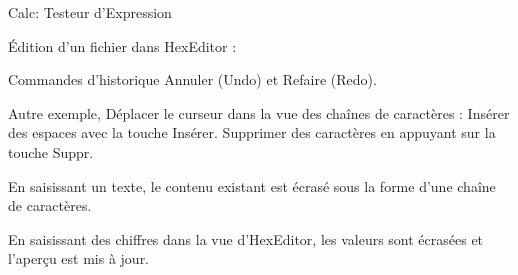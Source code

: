 Calc:
Testeur d'Expression

Édition d'un fichier dans HexEditor :

Commandes d'historique Annuler (Undo) et Refaire (Redo).

Autre exemple, Déplacer le curseur dans la vue des chaînes de caractères :
Insérer des espaces avec la touche Insérer.
Supprimer des caractères en appuyant sur la touche Suppr.

En saisissant un texte, le contenu existant est écrasé sous la forme d'une chaîne de caractères.

En saisissant des chiffres dans la vue d'HexEditor, les valeurs sont écrasées et l'aperçu est mis à jour.

